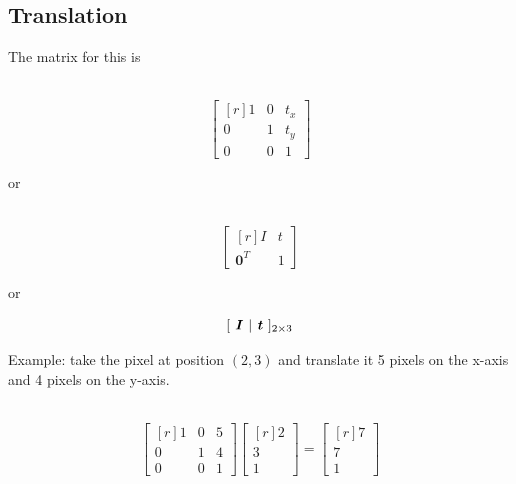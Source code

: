 \subsection{Translation}
The matrix for this is 
\begin{minipage}{0.2\textwidth}
         \ \ \
                $$  \begin{bmatrix*}[r]
                1      & 0  & t_x \\
                0       & 1  & t_y  \\
                0        & 0   & 1  
            \end{bmatrix*} $$   
\end{minipage}
or
\begin{minipage}{0.2\textwidth}
\ \ \
                $$  \begin{bmatrix*}[r]
                I& t \\
                \textbf{0}^T       & 1 
            \end{bmatrix*} $$
\end{minipage}
or
\begin{minipage}{0.2\textwidth}
    $$[ \ \textbf{\textit{I}} \ | \ \textbf{\textit{t}} \ ]_{2\times3}$$
\end{minipage}
Example: take the pixel at position $(2,3)$ and translate it 5 pixels on the x-axis and 4 pixels on the y-axis.
\begin{minipage}{0.2\textwidth}
         \ \ \
                $$  \begin{bmatrix*}[r]
                1      & 0  & 5 \\
                0       & 1  & 4  \\
                0        & 0   & 1  
            \end{bmatrix*} 
            \begin{bmatrix*}[r]
                2\\
                3  \\
                1   
            \end{bmatrix*} 
            = \begin{bmatrix*}[r]
                7\\
                7  \\
                1   
            \end{bmatrix*} 
            $$   
\end{minipage}

